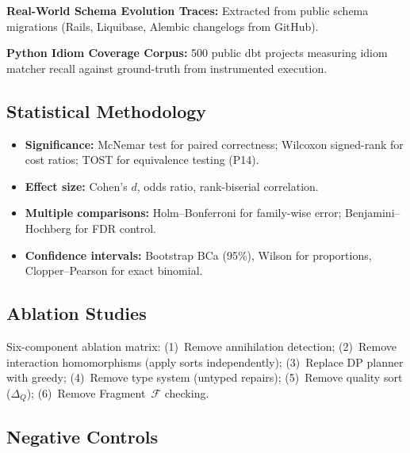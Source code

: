 \documentclass[11pt,a4paper]{article}
\theoremstyle{definition}
\newcommand{\DeltaQ}{\Delta_{\!Q}}
\newcommand{\FragF}{\mathcal{F}}
\begin{document}
\textbf{Real-World Schema Evolution Traces:} Extracted from public schema
migrations (Rails, Liquibase, Alembic changelogs from GitHub).

\textbf{Python Idiom Coverage Corpus:} 500 public dbt projects measuring
idiom matcher recall against ground-truth from instrumented execution.

\subsection{Statistical Methodology}
\label{sec:stats}

\begin{itemize}[nosep]
  \item \textbf{Significance:} McNemar test for paired correctness; Wilcoxon
    signed-rank for cost ratios; TOST for equivalence testing (P14).
  \item \textbf{Effect size:} Cohen's $d$, odds ratio, rank-biserial correlation.
  \item \textbf{Multiple comparisons:} Holm--Bonferroni for family-wise error;
    Benjamini--Hochberg for FDR control.
  \item \textbf{Confidence intervals:} Bootstrap BCa (95\%), Wilson for
    proportions, Clopper--Pearson for exact binomial.
\end{itemize}

\subsection{Ablation Studies}
\label{sec:ablations}

Six-component ablation matrix:
(1)~Remove annihilation detection;
(2)~Remove interaction homomorphisms (apply sorts independently);
(3)~Replace DP planner with greedy;
(4)~Remove type system (untyped repairs);
(5)~Remove quality sort ($\DeltaQ$);
(6)~Remove Fragment~$\FragF$ checking.

\subsection{Negative Controls}
\label{sec:negative-controls}
\end{document}
